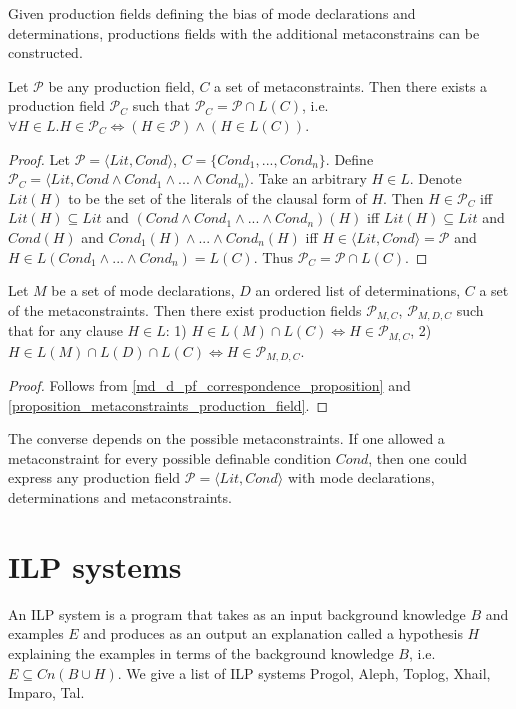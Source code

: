 Given production fields defining the bias of mode declarations and determinations, productions fields with the additional metaconstrains can be constructed.

\begin{proposition}\label{proposition_metaconstraints_production_field}
Let $\mathcal{P}$ be any production field, $C$ a set of metaconstraints.
Then there exists a production field $\mathcal{P}_C$ such that
$\mathcal{P}_C=\mathcal{P} \cap L(C)$, i.e.
$\forall H \in L. H \in \mathcal{P}_C \iff (H \in \mathcal{P}) \land (H \in L(C))$.
\end{proposition}
\begin{proof}
Let $\mathcal{P}=\langle Lit, Cond \rangle$,
$C=\{Cond_1, ..., Cond_n\}$.
Define $\mathcal{P}_C=\langle Lit, Cond \land Cond_1 \land ... \land Cond_n \rangle$. Take an arbitrary $H \in L$. Denote $Lit(H)$ to be the set of the literals of the clausal form of $H$.
Then $H \in \mathcal{P}_C$ iff $Lit(H) \subseteq Lit$ and
$(Cond \land Cond_1 \land ... \land Cond_n)(H)$ iff
$Lit(H) \subseteq Lit$ and $Cond(H)$ and $Cond_1(H) \land ... \land Cond_n(H)$
iff $H \in \langle Lit, Cond \rangle = \mathcal{P}$ and $H \in L(Cond_1 \land ... \land Cond_n) = L(C)$. Thus $\mathcal{P}_C=\mathcal{P} \cap L(C)$.
\end{proof}

\begin{corollary}
Let $M$ be a set of mode declarations, $D$ an ordered list of determinations, $C$ a set of the metaconstraints.
Then there exist production fields
$\mathcal{P}_{M,C}$,
$\mathcal{P}_{M,D,C}$
such that for any clause $H \in L$:
1) $H \in L(M) \cap L(C) \iff H \in \mathcal{P}_{M,C}$,
2) $H \in L(M) \cap L(D) \cap L(C) \iff H \in \mathcal{P}_{M,D,C}$.
\end{corollary}
\begin{proof}
Follows from \ref{md_d_pf_correspondence_proposition} and \ref{proposition_metaconstraints_production_field}.
\end{proof}

The converse depends on the possible metaconstraints. If one allowed a metaconstraint for every possible definable condition $Cond$, then one could express any production field $\mathcal{P}=\langle Lit, Cond \rangle$ with mode declarations, determinations and metaconstraints.

\section{ILP systems}
An ILP system is a program that takes as an input background knowledge $B$ and examples $E$ and produces as an output an explanation called a hypothesis $H$ explaining the examples in terms of the background knowledge $B$, i.e. $E \subseteq Cn(B \cup H)$.
We give a list of ILP systems Progol, Aleph, Toplog, Xhail, Imparo, Tal.


